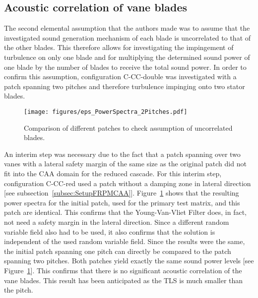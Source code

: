 \subsection{Acoustic correlation of vane blades}


The second elemental assumption that the authors made was to assume that the investigated sound generation mechanism of each blade is uncorrelated to that of the other blades.  This therefore allows for investigating the impingement of turbulence on only one blade and for multiplying the determined sound power of one blade by the number of blades to receive the total sound power.  In order to confirm this assumption, configuration C-CC-double was investigated with a patch spanning two pitches and therefore turbulence impinging onto two stator blades.

\begin{figure}
\centering
\texttt{[image: figures/eps\_PowerSpectra\_2Pitches.pdf]}
\caption{Comparison of different patches to check assumption of uncorrelated blades. \label{fig:PowerSpectra_2Pitches} }
\end{figure}
	
An interim step was necessary due to the fact that a patch spanning over two vanes with a lateral safety margin of the same size as the original patch did not fit into the CAA domain for the reduced cascade.  For this interim step, configuration C-CC-red used a patch without a damping zone in lateral direction [see subsection~\ref{subsec:SetupFRPMCAA}].  Figure~\ref{fig:PowerSpectra_2Pitches} shows that the resulting power spectra for the initial patch, used for the primary test matrix, and this patch are identical.  This confirms that the Young-Van-Vliet Filter does, in fact, not need a safety margin in the lateral direction.  Since a different random variable field also had to be used, it also confirms that the solution is independent of the used random variable field.  Since the results were the same, the initial patch spanning one pitch can directly be compared to the patch spanning two pitches.  Both patches yield exactly the same sound power levels [see Figure~\ref{fig:PowerSpectra_2Pitches}].  This confirms that there is no significant acoustic correlation of the vane blades. This result has been anticipated as the TLS is much smaller than the pitch.

